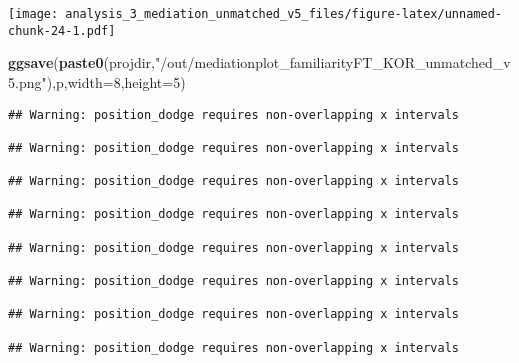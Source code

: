 \documentclass[
]{article}
\newenvironment{Shaded}{\begin{snugshade}}{\end{snugshade}}
\newcommand{\DataTypeTok}[1]{\textcolor[rgb]{0.13,0.29,0.53}{#1}}
\newcommand{\DecValTok}[1]{\textcolor[rgb]{0.00,0.00,0.81}{#1}}
\newcommand{\KeywordTok}[1]{\textcolor[rgb]{0.13,0.29,0.53}{\textbf{#1}}}
\newcommand{\NormalTok}[1]{#1}
\newcommand{\StringTok}[1]{\textcolor[rgb]{0.31,0.60,0.02}{#1}}
\begin{document}
\texttt{[image: analysis\_3\_mediation\_unmatched\_v5\_files/figure-latex/unnamed-chunk-24-1.pdf]}

\begin{Shaded}
\begin{Highlighting}[]
\KeywordTok{ggsave}\NormalTok{(}\KeywordTok{paste0}\NormalTok{(projdir,}\StringTok{"/out/mediationplot_familiarityFT_KOR_unmatched_v5.png"}\NormalTok{),p,}\DataTypeTok{width=}\DecValTok{8}\NormalTok{,}\DataTypeTok{height=}\DecValTok{5}\NormalTok{)}
\end{Highlighting}
\end{Shaded}

\begin{verbatim}
## Warning: position_dodge requires non-overlapping x intervals

## Warning: position_dodge requires non-overlapping x intervals

## Warning: position_dodge requires non-overlapping x intervals

## Warning: position_dodge requires non-overlapping x intervals

## Warning: position_dodge requires non-overlapping x intervals

## Warning: position_dodge requires non-overlapping x intervals

## Warning: position_dodge requires non-overlapping x intervals

## Warning: position_dodge requires non-overlapping x intervals
\end{verbatim}
\end{document}

